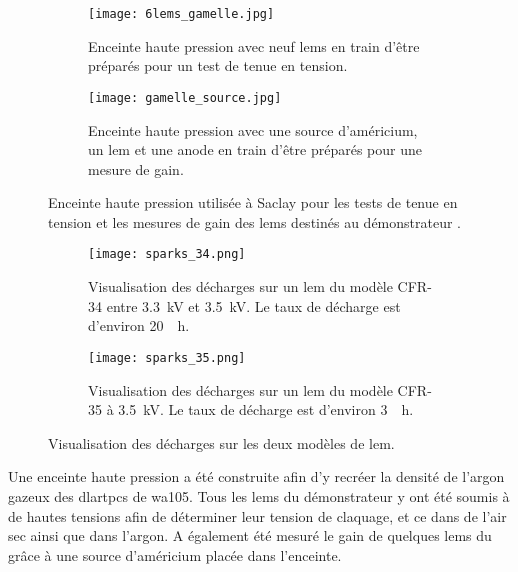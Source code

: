       \begin{figure}[htpb]
        \begin{subfigure}[t]{0.48\textwidth}
          \texttt{[image: 6lems\_gamelle.jpg]}
          \caption{\label{fig::6lems_gamelle}Enceinte haute pression avec neuf \glspl{lem} en train d'être préparés pour un test de tenue en tension.}
        \end{subfigure}
        \hfill
        \begin{subfigure}[t]{0.48\textwidth}
          \texttt{[image: gamelle\_source.jpg]}
          \caption{\label{fig::gamelle_source}Enceinte haute pression avec une source d'américium, un \gls{lem} et une anode en train d'être préparés pour une mesure de gain.}
        \end{subfigure}
        \caption[Enceinte haute pression]{\label{fig::gamelle}Enceinte haute pression utilisée à Saclay pour les tests de tenue en tension et les mesures de gain des \glspl{lem} destinés au démonstrateur \SSS{}.}
      \end{figure}

      \begin{figure}[htpb]
        \begin{subfigure}[t]{0.48\textwidth}
          \centering
          \texttt{[image: sparks\_34.png]}
          \caption{\label{fig::sparks_34}Visualisation des décharges sur un \gls{lem} du modèle CFR-34 entre \SI{3.3}{\kilo\volt} et \SI{3.5}{\kilo\volt}. Le taux de décharge est d'environ \SI{20}{\per\hour}.}
        \end{subfigure}
        \hfill
        \begin{subfigure}[t]{0.48\textwidth}
          \centering
          \texttt{[image: sparks\_35.png]}
          \caption{\label{fig::sparks_35}Visualisation des décharges sur un \gls{lem} du modèle CFR-35 à \SI{3.5}{\kilo\volt}. Le taux de décharge est d'environ \SI{3}{\per\hour}.}
        \end{subfigure}
        \caption[Visualisation des décharges sur les deux modèles de LEM]{\label{fig::sparks}Visualisation des décharges sur les deux modèles de \gls{lem}.}
      \end{figure}

      Une enceinte haute pression a été construite afin d'y recréer la densité de l'argon gazeux des \glspl{dlartpc} de \gls{wa105}. Tous les \glspl{lem} du démonstrateur \SSS{} y ont été soumis à de hautes tensions afin de déterminer leur tension de claquage, et ce dans de l'air sec ainsi que dans l'argon. A également été mesuré le gain de quelques \glspl{lem} du \SSS{} grâce à une source d'américium placée dans l'enceinte.
            
